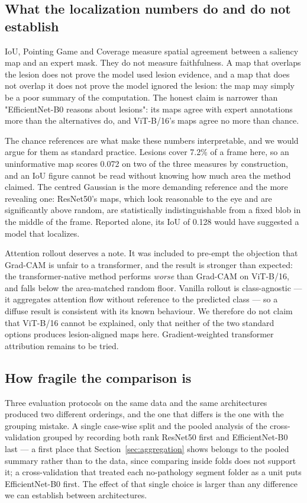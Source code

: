 \documentclass[preprint,12pt]{elsarticle}
\begin{document}
\subsection{What the localization numbers do and do not establish}

IoU, Pointing Game and Coverage measure spatial agreement between a saliency map and an expert mask. They do not measure faithfulness. A map that overlaps the lesion does not prove the model used lesion evidence, and a map that does not overlap it does not prove the model ignored the lesion: the map may simply be a poor summary of the computation. The honest claim is narrower than "EfficientNet-B0 reasons about lesions": its maps agree with expert annotations more than the alternatives do, and ViT-B/16's maps agree no more than chance.

The chance references are what make these numbers interpretable, and we would argue for them as standard practice. Lesions cover 7.2\% of a frame here, so an uninformative map scores 0.072 on two of the three measures by construction, and an IoU figure cannot be read without knowing how much area the method claimed. The centred Gaussian is the more demanding reference and the more revealing one: ResNet50's maps, which look reasonable to the eye and are significantly above random, are statistically indistinguishable from a fixed blob in the middle of the frame. Reported alone, its IoU of 0.128 would have suggested a model that localizes.

Attention rollout deserves a note. It was included to pre-empt the objection that Grad-CAM is unfair to a transformer, and the result is stronger than expected: the transformer-native method performs \emph{worse} than Grad-CAM on ViT-B/16, and falls below the area-matched random floor. Vanilla rollout is class-agnostic --- it aggregates attention flow without reference to the predicted class --- so a diffuse result is consistent with its known behaviour. We therefore do not claim that ViT-B/16 cannot be explained, only that neither of the two standard options produces lesion-aligned maps here. Gradient-weighted transformer attribution remains to be tried.

\subsection{How fragile the comparison is}

Three evaluation protocols on the same data and the same architectures produced two different orderings, and the one that differs is the one with the grouping mistake. A single case-wise split and the pooled analysis of the cross-validation grouped by recording both rank ResNet50 first and EfficientNet-B0 last --- a first place that Section~\ref{sec:aggregation} shows belongs to the pooled summary rather than to the data, since comparing inside folds does not support it; a cross-validation that treated each no-pathology segment folder as a unit puts EfficientNet-B0 first. The effect of that single choice is larger than any difference we can establish between architectures.
\end{document}

